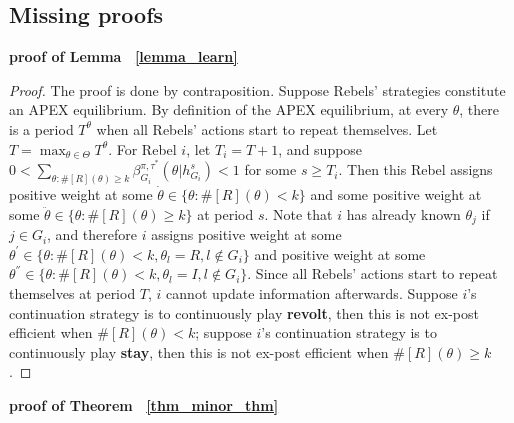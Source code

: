 \documentclass[12pt,letter]{article}
\newtheorem*{theorem*}{Theorem}
\newtheorem*{lemma*}{Lemma}
\theoremstyle{definition}
\theoremstyle{remark}
\theoremstyle{claim}
\begin{document}
\subsection{Missing proofs}
\noindent\textbf{proof of Lemma ~\ref{lemma_learn}}
\begin{proof}
The proof is done by contraposition. Suppose Rebels' strategies constitute an APEX equilibrium. By definition of the APEX equilibrium, at every $\theta$, there is a period $T^{\theta}$ when all Rebels' actions start to repeat themselves. Let $T=\max_{\theta\in \Theta}{T^{\theta}}$. For Rebel $i$, let $T_i=T+1$, and suppose $0<\sum_{\theta:\#[R](\theta)\geq k}\beta^{\pi,\tau^*}_{G_i}(\theta|h^{s}_{G_i})<1$ for some $s\geq T_i$. Then this Rebel assigns positive weight at some $\dot{\theta}\in \{\theta:\#[R](\theta)< k\}$ and some positive weight at some $\ddot{\theta}\in \{\theta:\#[R](\theta)\geq k\}$ at period $s$. Note that $i$ has already known $\theta_j$ if $j\in G_i$, and therefore $i$ assigns positive weight at some $\theta^{'}\in \{\theta:\#[R](\theta)< k, \theta_l=R, l\notin G_i\}$ and positive weight at some $\theta^{''}\in \{\theta:\#[R](\theta)< k, \theta_l=I, l\notin G_i\}$. Since all Rebels' actions start to repeat themselves at period $T$, $i$ cannot update information afterwards. Suppose $i$'s continuation strategy is to continuously play \textbf{revolt}, then this is not ex-post efficient when $\#[R](\theta)< k$; suppose $i$'s continuation strategy is to continuously play \textbf{stay}, then this is not ex-post efficient when $\#[R](\theta)\geq k$.
\end{proof}
%
%
\bigskip
\noindent\textbf{proof of Theorem ~\ref{thm_minor_thm}}
\end{document}
